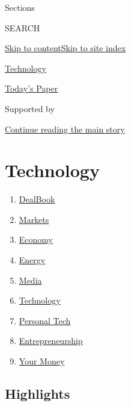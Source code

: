Sections

SEARCH

\protect\hyperlink{site-content}{Skip to
content}\protect\hyperlink{site-index}{Skip to site index}

\href{https://www.nytimes.com/section/technology}{Technology}

\href{https://myaccount.nytimes.com/auth/login?response_type=cookie\&client_id=vi}{}

\href{https://www.nytimes.com/section/todayspaper}{Today's Paper}

Supported by

\protect\hyperlink{after-sponsor}{Continue reading the main story}

\hypertarget{technology}{%
\section{Technology}\label{technology}}

\begin{enumerate}
\def\labelenumi{\arabic{enumi}.}
\tightlist
\item
  \href{/pages/business/dealbook/index.html}{DealBook}
\item
  \href{https://markets.on.nytimes.com}{Markets}
\item
  \href{/section/business/economy}{Economy}
\item
  \href{/section/business/energy-environment}{Energy}
\item
  \href{/section/business/media}{Media}
\item
  \href{/section/technology}{Technology}
\item
  \href{/section/technology/personaltech}{Personal Tech}
\item
  \href{/section/business/smallbusiness}{Entrepreneurship}
\item
  \href{/section/your-money}{Your Money}
\end{enumerate}

\hypertarget{highlights}{%
\subsection{Highlights}\label{highlights}}

